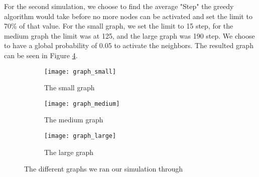 For the second simulation, we choose to find the average "Step" the greedy algorithm would take before no more nodes can be activated and set the limit to 70\% of that value. For the small graph, we set the limit to 15 step, for the medium graph the limit was at 125, and the large graph was 190 step. We choose to have a global probability of 0.05 to activate the neighbors. The resulted graph can be seen in Figure \ref{fig:graph}.  


\begin{figure}[!ht]
	\begin{subfigure}{0.3\textwidth}
		\texttt{[image: graph\_small]}
		\caption{The small graph} 
		\label{graphS}
	\end{subfigure}
	\begin{subfigure}{0.3\textwidth}
		\texttt{[image: graph\_medium]}
		\caption{The medium graph} 
		\label{graphM}
	\end{subfigure}
	\begin{subfigure}{0.3\textwidth}
		\texttt{[image: graph\_large]}
		\caption{The large graph} 
		\label{fig:graphL}
	\end{subfigure}
	\caption{The different graphs we ran our simulation through}
	\label{fig:graph}
\end{figure}

